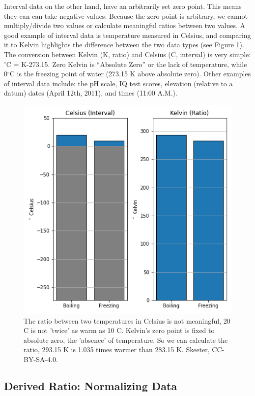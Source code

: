 \documentclass[
]{book}
\begin{document}
Interval data on the other hand, have an arbitrarily set zero point. This means they can can take negative values. Because the zero point is arbitrary, we cannot multiply/divide two values or calculate meaningful ratios between two values. A good example of interval data is temperature measured in Celsius, and comparing it to Kelvin highlights the difference between the two data types (see Figure \ref{fig:3-interval-ratio-temperature}). The conversion between Kelvin (K, ratio) and Celsius (C, interval) is very simple: \(^\circ\)C = K-273.15. Zero Kelvin is ``Absolute Zero'' or the lack of temperature, while 0\(^\circ\)C is the freezing point of water (273.15 K above absolute zero). Other examples of interval data include: the pH scale, IQ test scores, elevation (relative to a datum) dates (April 12th, 2011), and times (11:00 A.M.).

\begin{figure}
\includegraphics[width=0.75\linewidth]{images/03-interval-ratio-temperature} \caption{The ratio between two temperatures in Celsius is not meaningful, 20 C is not 'twice' as warm as 10 C. Kelvin's zero point is fixed to absolute zero, the 'absence' of temperature.  So we can calculate the ratio, 293.15 K is 1.035 times warmer than 283.15 K. Skeeter, CC-BY-SA-4.0.}\label{fig:3-interval-ratio-temperature}
\end{figure}

\subsection{Derived Ratio: Normalizing Data}\label{derived-ratio-normalizing-data}
\end{document}
